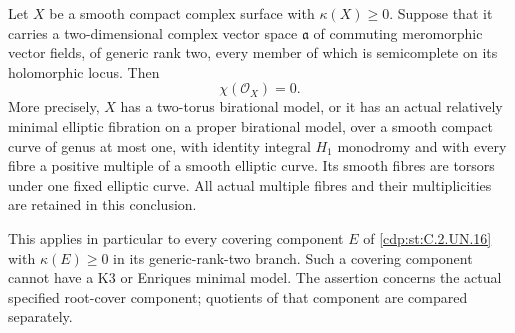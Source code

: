 
\begin{proposition}\label{cdp:st:C.2.UN.22}
Let $X$ be a smooth compact complex surface with
$\kappa(X)\ge0$. Suppose that it carries a two-dimensional
complex vector space $\mathfrak a$ of commuting meromorphic
vector fields, of generic rank two, every member of which
is semicomplete on its holomorphic locus. Then
\[
                         \chi(\mathcal O_X)=0.
                                                               \tag{C.RF.5}\label{cdp:eq:C.RF.5}
\]
More precisely, $X$ has a two-torus birational model,
or it has an actual relatively minimal elliptic fibration
on a proper birational model, over a smooth compact curve
of genus at most one, with identity integral $H_1$ monodromy
and with every fibre a positive multiple of a smooth elliptic
curve. Its smooth fibres are torsors under one fixed elliptic
curve. All actual multiple fibres and their multiplicities
are retained in this conclusion.

This applies in particular to every covering component
$E$ of \ref{cdp:st:C.2.UN.16} with $\kappa(E)\ge0$ in its
generic-rank-two branch. Such a covering component cannot
have a K3 or Enriques minimal model. The assertion concerns
the actual specified root-cover component; quotients of that
component are compared separately.
\end{proposition}

